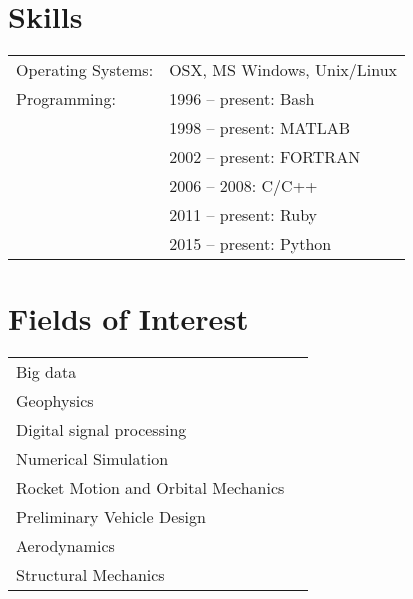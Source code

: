 \documentclass[a4paper]{article}
\newcommand{\procv}[2]{\iftoggle{professionalcv}{#1}{#2}}
\newlength{\listskipbig}
\newenvironment{cvsection}[2]{
  \setlength{\floatsep}{0pt}
  \setlength{\textfloatsep}{0pt}
  \setlength{\intextsep}{0pt}
  \section*{#1}
  \begin{longtable}{lp{#2}}
}{
  \end{longtable}
}
\begin{document}
\begin{cvsection}{Skills}{11.2cm}
Operating Systems: & OSX, MS Windows, Unix/Linux \\[\listskipbig]

Programming:
& 1996 -- present: Bash \\
& 1998 -- present: MATLAB \\
& 2002 -- present: FORTRAN \\
& 2006 -- 2008: C/C++ \\
& 2011 -- present: Ruby \\
& 2015 -- present: Python\\[\listskipbig]
\end{cvsection}


\begin{cvsection}{Fields of Interest}{10cm}
 Big data & \\
 Geophysics & \\
 Digital signal processing & \\
 Numerical Simulation & \\
 Rocket Motion and Orbital Mechanics & \\
 Preliminary Vehicle Design & \\
 Aerodynamics & \\
 Structural Mechanics & \\
\end{cvsection}


\end{document}
